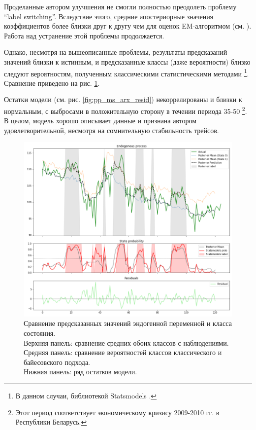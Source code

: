 \documentclass[a4paper,14pt]{extreport}
\begin{document}
Проделанные автором улучшения не смогли полностью преодолеть проблему ``label switching''. Вследствие этого, средние апостериорные значения коэффициентов более близки друг к другу чем для оценок EM-алгоритмом (см. ). Работа над устранение этой проблемы продолжается. 

Однако, несмотря на вышеописанные проблемы, результаты предсказаний значений близки к истинным, и предсказанные классы (даже вероятности) близко следуют вероятностям, полученным классическими статистическими методами \footnote{В данном случаи, библиотекой Statsmodels \cite{statsmodels}. }. Сравнение приведено на рис. \ref{fig:pp_ms_arx_fit}.

Остатки модели (см. рис. \ref{fig:pp_ms_arx_resid}) некоррелированы и близки к нормальным, с выбросами в положительную сторону в течении периода 35-50 \footnote{Этот период соответствует экономическому кризису 2009-2010 гг. в Республики Беларусь. }. В целом, модель хорошо описывает данные и признана автором удовлетворительной, несмотря на сомнительную стабильность трейсов.

\begin{figure}[H]
	\includegraphics[width=\linewidth]{img/gen/pp_ms_arx_fit.png}
	\caption{
		Сравнение предсказанных значений эндогенной переменной и класса состояния. \\
		Верхняя панель: сравнение средних обоих классов с наблюдениями. \\
		Средняя панель: сравнение вероятностей классов классического и байесовского подхода. \\
		Нижняя панель: ряд остатков модели.
	}
	\label{fig:pp_ms_arx_fit}
\end{figure}
\end{document}
